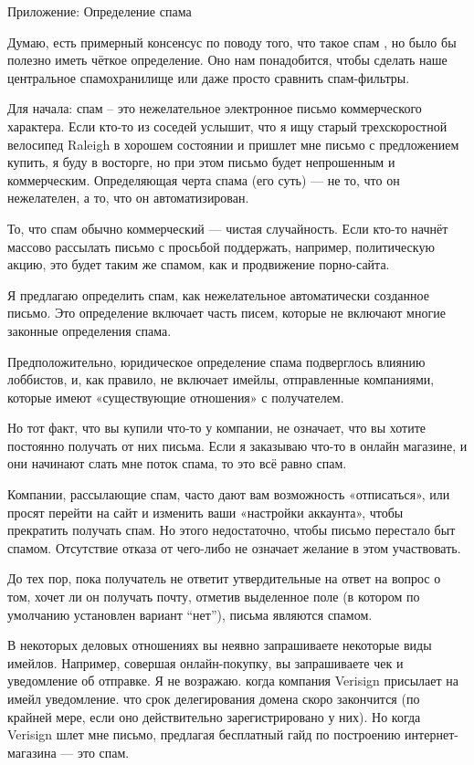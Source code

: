 \documentclass[ebook,12pt,oneside,openany]{memoir}
\begin{document}
Приложение: Определение спама

Думаю, есть примерный консенсус по поводу того, что такое спам , но
было бы полезно иметь чёткое определение. Оно нам понадобится, чтобы
сделать наше центральное спамохранилище или даже просто сравнить
спам-фильтры.

Для начала: спам – это нежелательное электронное письмо коммерческого
характера. Если кто-то из соседей услышит, что я ищу старый
трехскоростной велосипед Raleigh в хорошем состоянии и пришлет мне
письмо с предложением купить, я буду в восторге, но при этом письмо
будет непрошенным и коммерческим. Определяющая черта спама (его суть)
— не то, что он нежелателен, а то, что он автоматизирован.

То, что спам обычно коммерческий — чистая случайность. Если кто-то
начнёт массово рассылать письмо с просьбой поддержать, например,
политическую акцию, это будет таким же спамом, как и продвижение
порно-сайта.

Я предлагаю определить спам, как нежелательное автоматически созданное
письмо. Это определение включает часть писем, которые не включают
многие законные определения спама.

Предположительно, юридическое определение спама подверглось влиянию
лоббистов, и, как правило, не включает имейлы, отправленные
компаниями, которые имеют «существующие отношения» с получателем.

Но тот факт, что вы купили что-то у компании, не означает, что вы
хотите постоянно получать от них письма. Если я заказываю что-то в
онлайн магазине, и они начинают слать мне поток спама, то это всё
равно спам.

Компании, рассылающие спам, часто дают вам возможность «отписаться»,
или просят перейти на сайт и изменить ваши «настройки аккаунта», чтобы
прекратить получать спам. Но этого недостаточно, чтобы письмо
перестало быт спамом. Отсутствие отказа от чего-либо не означает
желание в этом участвовать.

До тех пор, пока получатель не ответит утвердительные на ответ на
вопрос о том, хочет ли он получать почту, отметив выделенное поле (в
котором по умолчанию установлен вариант “нет”), письма являются
спамом.

В некоторых деловых отношениях вы неявно запрашиваете некоторые виды
имейлов. Например, совершая онлайн-покупку, вы запрашиваете чек и
уведомление об отправке. Я не возражаю. когда компания Verisign
присылает на имейл уведомление. что срок делегирования домена скоро
закончится (по крайней мере, если оно действительно зарегистрировано у
них). Но когда Verisign шлет мне письмо, предлагая бесплатный гайд по
построению интернет-магазина — это спам.
\end{document}
